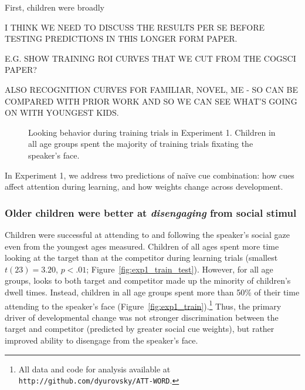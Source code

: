 \documentclass[man,floatsintext]{apa6}
\begin{document}
First, children were broadly 

I THINK WE NEED TO DISCUSS THE RESULTS PER SE BEFORE TESTING PREDICTIONS IN THIS LONGER FORM PAPER.

E.G. SHOW TRAINING ROI CURVES THAT WE CUT FROM THE COGSCI PAPER?

ALSO RECOGNITION CURVES FOR FAMILIAR, NOVEL, ME - SO CAN BE COMPARED WITH PRIOR WORK AND SO WE CAN SEE WHAT'S GOING ON WITH YOUNGEST KIDS.

\begin{figure}[tb]
	\caption{\label{fig:design} Looking behavior during training trials in Experiment 1. Children in all age groups spent the majority of training trials fixating the speaker's face.}
\end{figure}

In Experiment 1, we address two predictions of na\"{i}ve cue combination: how cues affect attention during learning, and how weights change across development.

\subsubsection{Older children were better at \emph{disengaging} from social stimul} 

Children were successful at attending to and following the speaker's social gaze even from the youngest ages measured. Children of all ages spent more time looking at the target than at the competitor during learning trials (smallest $t(23)  = 3.20$, $p < .01$; Figure~\ref{fig:exp1_train_test}). However, for all age groups, looks to both target and competitor made up the minority of children's dwell times. Instead, children in all age groups spent more than 50\% of their time attending to the speaker's face (Figure~\ref{fig:exp1_train}).\footnote{All data and code for analysis available at \small{\tt{http://github.com/dyurovsky/ATT-WORD}}.} Thus, the primary driver of developmental change was not stronger discrimination between the target and competitor (predicted by greater social cue weights), but rather improved ability to disengage from the speaker's face. 
\end{document}
